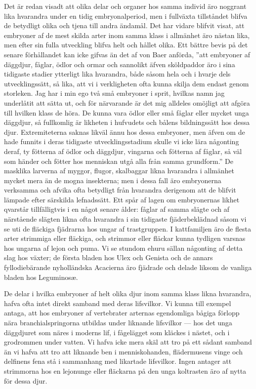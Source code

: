 Det är redan visadt att olika delar och organer hos samma individ äro noggrant lika hvarandra under en tidig embryonalperiod, men i fullväxta tillståndet blifva de betydligt olika och tjena till andra ändamål. Det har vidare blifvit visat, att embryoner af de mest skilda arter inom samma klass i allmänhet äro nästan lika, men efter sin fulla utveckling blifva helt och hållet olika. Ett bättre bevis på det senare förhållandet kan icke gifvas än det af von Baer anförda, ”att embryoner af däggdjur, fåglar, ödlor och ormar och sannolikt äfven sköldpaddor äro i sina tidigaste stadier ytterligt lika hvarandra, både såsom hela och i hvarje dels utvecklingssätt, så lika, att vi i verkligheten ofta kunna skilja dem endast genom storleken. Jag har i min ego två små embryoner i sprit, hvilkas namn jag underlåtit att sätta ut, och för närvarande är det mig alldeles omöjligt att afgöra till hvilken klass de höra. De kunna vara ödlor eller små fåglar eller mycket unga däggdjur, så fullkomlig är likheten i hufvudets och bålens bildningssätt hos dessa djur. Extremiteterna saknas likväl ännu hos dessa embryoner, men äfven om de hade funnits i deras tidigaste utvecklingsstadium skulle vi icke lära någonting deraf, ty fötterna af ödlor och däggdjur, vingarna och fötterna af fåglar, så väl som händer och fötter hos menniskan utgå alla från samma grundform.” De masklika larverna af myggor, flugor, skalbaggar likna hvarandra i allmänhet mycket mera än de mogna insekterna; men i dessa fall äro embryonerna verksamma och afvika ofta betydligt från hvarandra derigenom att de blifvit lämpade efter särskilda lefnadssätt. Ett spår af lagen om embryonernas likhet qvarstår tillfälligtvis i en något senare ålder: fåglar af samma slägte och af närstående slägten likna ofta hvarandra i sin tidigaste fjäderbeklädnad såsom vi se uti de fläckiga fjädrarna hos ungar af trastgruppen. I kattfamiljen äro de flesta arter strimmiga eller fläckiga, och strimmor eller fläckar kunna tydligen varsnas hos ungarna af lejon och puma. Vi se stundom ehuru sällan någonting af detta slag hos växter; de första bladen hos Ulex och Genista och de annars fyllodiebärande nyholländska Acacierna äro fjädrade och delade liksom de vanliga bladen hos Leguminosæ.

De delar i hvilka embryoner af helt olika djur inom samma klass likna hvarandra, hafva ofta intet direkt samband med deras lifsvilkor. Vi kunna till exempel antaga, att hos embryoner af vertebrater arternas egendomliga bågiga förlopp nära branchialspringorna utbildas under liknande lifsvilkor — hos det unga däggdjuret som näres i moderns lif, i fågelägget som kläckes i nästet, och i grodrommen under vatten. Vi hafva icke mera skäl att tro på ett sådant samband än vi hafva att tro att liknande ben i menniskohanden, flädermusens vinge och delfinens fena stå i sammanhang med likartade lifsvilkor. Ingen antager att strimmorna hos en lejonunge eller fläckarna på den unga koltrasten äro af nytta för dessa djur.

